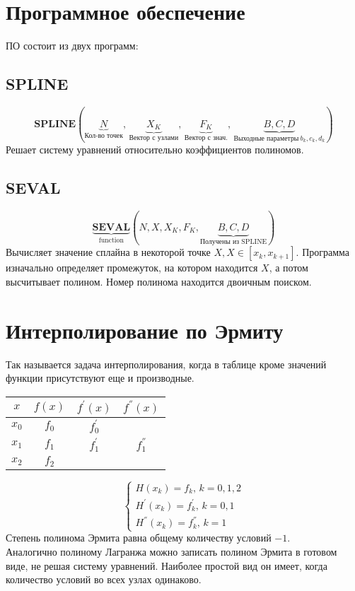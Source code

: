 \documentclass[a4paper,11pt]{article}
\begin{document}
\section{Программное обеспечение}
ПО состоит из двух программ:
  \subsection{SPLINE}
  \[\textbf{SPLINE}(\underbrace{N}_{\text{Кол-во точек}},\,\underbrace{X_K}_{\text{Вектор с узлами}},\,
                    \underbrace{F_K}_{\text{Вектор с знач.}},\,\underbrace{B, C, D}_{\text{Выходные параметры}\ b_k, c_k, d_k})\]
  Решает систему уравнений относительно коэффициентов полиномов.
  \subsection{SEVAL}
  \[\underbrace{\textbf{SEVAL}}_{\text{function}}(N, X, X_K, F_K, \underbrace{B, C, D}_{\text{Получены из SPLINE}})\]
  Вычисляет значение сплайна в некоторой точке $X, X \in [x_k, x_{k+1}]$. Программа изначально определяет промежуток, на котором находится $X$, а потом высчитывает полином.
    Номер полинома находится двоичным поиском.

\section{Интерполирование по Эрмиту}
Так называется задача интерполирования, когда в таблице кроме значений функции присутствуют еще и производные. \\
\begin{tabular}{ c|c|c|c }
  $x$   & $f(x)$ & $f^{'}(x)$ & $f^{''}(x)$ \\
  \hline
  $x_0$ & $f_0$  & $f^{'}_0$  & \\
  $x_1$ & $f_1$  & $f^{'}_1$  & $f^{''}_1$ \\
  $x_2$ & $f_2$  &            &
\end{tabular}
\begin{equation*}
  \begin{cases}
    H(x_k) = f_k,\, k = 0, 1, 2 \\
    H^{'}(x_k) = f^{'}_k,\, k = 0, 1 \\
    H^{''}(x_k) = f^{''}_k,\, k = 1
  \end{cases}
\end{equation*}
Степень полинома Эрмита равна общему количеству условий $-1$. \\
Аналогично полиному Лагранжа можно записать полином Эрмита в готовом виде, не решая систему уравнений. Наиболее простой вид он имеет, когда количество условий во всех узлах одинаково.
\end{document}
